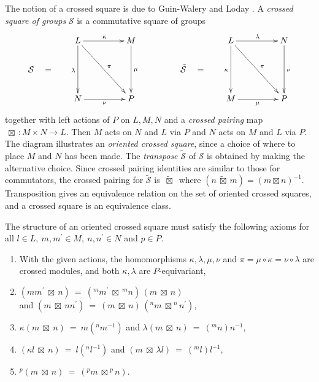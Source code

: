 \documentclass{ws-ijac}
\newcommand{\calS}{\mathcal{S}}
\newcommand{\bt}      {\boxtimes}
\newcommand{\btt}     {\ \tilde{\boxtimes}\ }
\begin{document}
The notion of a crossed square is due to Guin-Walery and Loday \cite{walery-loday}. 
A \emph{crossed square of groups} $\calS$ is a commutative square of groups 
\begin{equation} \label{xsq-diag}
\xymatrix@R=20pt@C=20pt
{     &  L \ar[dd]_{\lambda} \ar[rr]^{\kappa} \ar[ddrr]^{\pi} 
         &  & M \ar[dd]^{\mu} 
               &  &  &  L \ar[dd]_{\kappa} \ar[rr]^{\lambda} \ar[ddrr]^{\pi} 
                        &  &  N \ar[dd]^{\nu} \\
\calS \quad = 
      &  &  &  &  &  \tilde{\calS} \quad =  \\  
      &  N \ar[rr]_{\nu} 
         &  & P & &  &  M \ar[rr]_{\mu} 
                        &  &  P } 
\end{equation}
\noindent together with left actions of $P$ on $L,M,N$ 
and a \emph{crossed pairing} map ${\ \bt\ } : M \times N \rightarrow L$. 
Then $M$ acts on $N$ and $L$ via $P$ and $N$ acts on $M$ and $L$ via $P$. 
The diagram illustrates an \emph{oriented crossed square}, 
since a choice of where to place $M$ and $N$ has been made. 
The \emph{transpose} $\tilde{\calS}$ of $\calS$ is obtained by making the alternative choice. 
Since crossed pairing identities are similar to those for commutators, 
the crossed pairing for $\tilde{\calS}$ is $\btt$ 
where $(n \btt m) = (m \bt n)^{-1}$. 
Transposition gives an equivalence relation on the set of 
oriented crossed squares, and a crossed square is an equivalence class. 

The structure of an oriented crossed square must satisfy the following axioms 
for all $l \in L,~ m,m^{\prime} \in M,~ n,n^{\prime} \in N$ and $p \in P$. 
\begin{enumerate} 
\item 
With the given actions, the homomorphisms $\kappa, \lambda, \mu, \nu$ 
and $\pi = \mu\circ\kappa = \nu\circ\lambda$ are crossed modules, 
and both $\kappa, \lambda$ are $P$-equivariant, 
\item
$(mm^{\prime} {\ \bt\ } n) ~=~ (^{m}m^{\prime} {\ \bt\ } {^{m}n})\,(m {\ \bt\ } n)$  
\\
and \quad 
$(m {\ \bt\ } {nn^{\prime}}) ~=~ (m {\ \bt\ } n)\,(^{n}m {\ \bt\ } ^{n}n^{\prime})$, 
\item 
$\kappa(m {\ \bt\ } n) ~=~ m({}^{n} m^{-1})$ 
\quad and \quad 
$\lambda(m {\ \bt\ } n) ~=~ ({}^{m}n)n^{-1}$, 
\item 
$(\kappa l {\ \bt\ } n) ~=~ l({}^{n} l^{-1})$  
\quad and \quad 
$(m {\ \bt\ } \lambda l) ~=~ ({}^{m}l)l^{-1}$, 
\item 
$^{p}(m {\ \bt\ } n) ~=~ (^{p}m {\ \bt\ } ^{p}n)$. 
\end{enumerate} 
\end{document}
